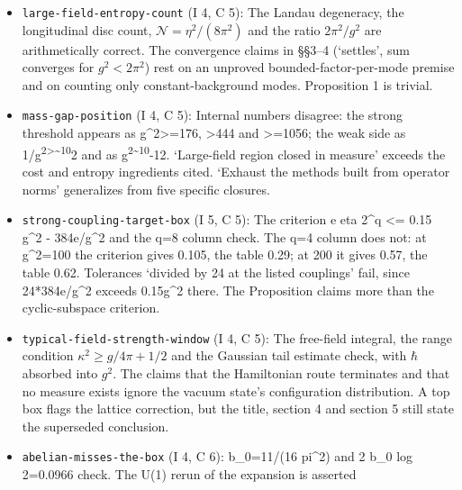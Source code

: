 \documentclass[11pt,a4paper]{article}
\begin{document}
\begin{itemize}
  \texttt{ground-state-measure-transfer} (I 4, C 5): Proposition 1 is
  standard and correct. The claim that isotropic Wilson-measure
  estimates hold `verbatim' ignores that the Hamiltonian limit is the
  anisotropic \(a_t\to0\) measure. The bound
  \(\mathbb P\lesssim e^{-c\eta^2/g(\ell)^2}\) in section 3 is a
  heuristic presented as available. The section 4 competition is marked
  superseded in part; the action display carries a stray factor.
\item
  \texttt{large-field-entropy-count} (I 4, C 5): The Landau degeneracy,
  the longitudinal disc count, \(\mathcal N=\eta^2/(8\pi^2)\) and the
  ratio \(2\pi^2/g^2\) are arithmetically correct. The convergence
  claims in §§3--4 (`settles', sum converges for \(g^2<2\pi^2\)) rest on
  an unproved bounded-factor-per-mode premise and on counting only
  constant-background modes. Proposition 1 is trivial.
\item
  \texttt{mass-gap-position} (I 4, C 5): Internal numbers disagree: the
  strong threshold appears as g\^{}2\textgreater=176, \textgreater444
  and \textgreater=1056; the weak side as
  1/g\textsuperscript{2\textgreater\textasciitilde10}2 and as
  g\textsuperscript{2\textasciitilde10}-12. `Large-field region closed
  in measure' exceeds the cost and entropy ingredients cited. `Exhaust
  the methods built from operator norms' generalizes from five specific
  closures.
\item
  \texttt{strong-coupling-target-box} (I 5, C 5): The criterion e eta
  2\^{}q \textless= 0.15 g\^{}2 - 384e/g\^{}2 and the q=8 column check.
  The q=4 column does not: at g\^{}2=100 the criterion gives 0.105, the
  table 0.29; at 200 it gives 0.57, the table 0.62. Tolerances `divided
  by 24 at the listed couplings' fail, since 24*384e/g\^{}2 exceeds
  0.15g\^{}2 there. The Proposition claims more than the cyclic-subspace
  criterion.
\item
  \texttt{typical-field-strength-window} (I 4, C 5): The free-field
  integral, the range condition \(\kappa^2\ge g/4\pi+1/2\) and the
  Gaussian tail estimate check, with \(\hbar\) absorbed into \(g^2\).
  The claims that the Hamiltonian route terminates and that no measure
  exists ignore the vacuum state's configuration distribution. A top box
  flags the lattice correction, but the title, section 4 and section 5
  still state the superseded conclusion.
\item
  \texttt{abelian-misses-the-box} (I 4, C 6): b\_0=11/(16 pi\^{}2) and 2
  b\_0 log 2=0.0966 check. The U(1) rerun of the expansion is asserted

\end{itemize}
\end{document}
